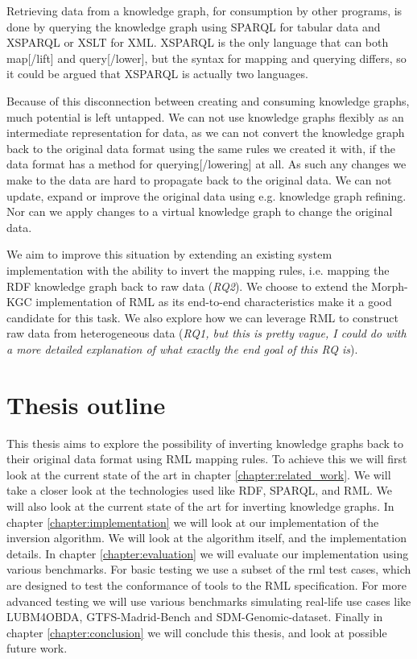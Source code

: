 Retrieving data from a knowledge graph, for consumption by other programs, is done by querying the knowledge graph using SPARQL \citep{Seaborne:08:SQL} for tabular data and XSPARQL \citep{Bischof2012} or XSLT for XML. XSPARQL is the only language that can both map[/lift] and query[/lower], but the syntax for mapping and querying differs, so it could be argued that XSPARQL is actually two languages.

Because of this disconnection between creating and consuming knowledge graphs, much potential is left untapped. We can not use knowledge graphs flexibly as an intermediate representation for data, as we can not convert the knowledge graph back to the original data format using the same rules we created it with, if the data format has a method for querying[/lowering] at all. As such any changes we make to the data are hard to propagate back to the original data. We can not update, expand or improve the original data using e.g. knowledge graph refining. Nor can we apply changes to a virtual knowledge graph to change the original data. 

We aim to improve this situation by extending an existing system implementation with the ability to invert the mapping rules, i.e. mapping the RDF knowledge graph back to raw data (\textit{RQ2}). We choose to extend the Morph-KGC implementation \citep{arenas2022morph} of RML \citep{dimou_ldow_2014} as its end-to-end characteristics make it a good candidate for this task. 
We also explore how we can leverage RML to construct raw data from heterogeneous data (\textit{RQ1, but this is pretty vague, I could do with a more detailed explanation of what exactly the end goal of this RQ is}). 


\section{Thesis outline}
This thesis aims to explore the possibility of inverting knowledge graphs back to their original data format using RML mapping rules. To achieve this we will first look at the current state of the art in chapter \ref{chapter:related_work}. We will take a closer look at the technologies used like RDF, SPARQL, and RML. We will also look at the current state of the art for inverting knowledge graphs. In chapter \ref{chapter:implementation} we will look at our implementation of the inversion algorithm. We will look at the algorithm itself, and the implementation details. In chapter \ref{chapter:evaluation} we will evaluate our implementation using various benchmarks. For basic testing we use a subset of the rml test cases, which are designed to test the conformance of tools to the RML specification. For more advanced testing we will use various benchmarks simulating real-life use cases like LUBM4OBDA, GTFS-Madrid-Bench and SDM-Genomic-dataset. Finally in chapter \ref{chapter:conclusion} we will conclude this thesis, and look at possible future work.